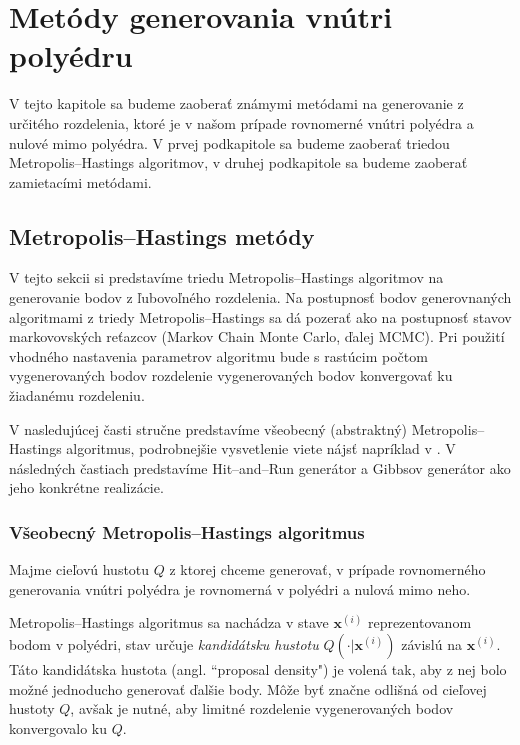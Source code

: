 \chapter{Metódy generovania vnútri polyédru}

V tejto kapitole sa budeme zaoberať známymi metódami na generovanie z určitého rozdelenia, ktoré je v našom prípade rovnomerné vnútri polyédra a nulové mimo polyédra. V prvej podkapitole sa budeme zaoberať triedou Metropolis--Hastings algoritmov, v druhej podkapitole sa budeme zaoberať zamietacími metódami.

\section{Metropolis--Hastings metódy}

V tejto sekcii si predstavíme triedu Metropolis--Hastings algoritmov na generovanie bodov z ľubovoľného rozdelenia. Na postupnosť bodov generovnaných algoritmami z triedy Metropolis--Hastings sa dá pozerať ako na postupnosť stavov markovovských reťazcov (Markov Chain Monte Carlo, ďalej MCMC). Pri použití vhodného nastavenia parametrov algoritmu bude s rastúcim počtom vygenerovaných bodov rozdelenie vygenerovaných bodov konvergovať ku žiadanému rozdeleniu.

V nasledujúcej časti stručne predstavíme všeobecný (abstraktný) Metropolis--Hastings algoritmus, podrobnejšie vysvetlenie viete nájsť napríklad v \cite{metropolis-hastings_chib}. V následných častiach predstavíme Hit--and--Run generátor a Gibbsov generátor ako jeho konkrétne realizácie.

\subsection{Všeobecný Metropolis--Hastings algoritmus}

Majme cieľovú hustotu $Q$ z ktorej chceme generovať, v prípade rovnomerného generovania vnútri polyédra je rovnomerná v polyédri a nulová mimo neho.

Metropolis--Hastings algoritmus \cite{metropolis-hastings_chib} sa nachádza v stave $\mathbf x^{(i)}$ reprezentovanom bodom v polyédri, stav určuje \textit{kandidátsku hustotu} $Q(\cdot|\mathbf x^{(i)})$ závislú na $\mathbf x^{(i)}$. Táto kandidátska hustota (angl. ``proposal density") je volená tak, aby z nej bolo možné jednoducho generovať ďalšie body. Môže byť značne odlišná od cieľovej hustoty $Q$, avšak je nutné, aby limitné rozdelenie vygenerovaných bodov konvergovalo ku $Q$.

